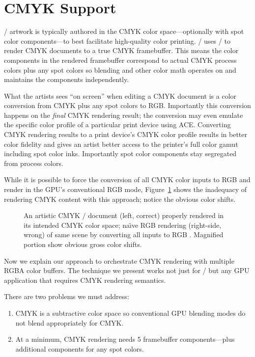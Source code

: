 
\section{CMYK Support}
\label{sec:cmyk}

\Illustrator/ artwork is typically authored in the CMYK color space---optionally with spot color components---to
best facilitate high-quality color printing.
\Illustrator/ uses \AGM/ to render CMYK documents to a true CMYK framebuffer.
This means the color components in the rendered framebuffer
correspond to actual CMYK process colors plus any spot colors so blending and other color math
operates on and maintains the components independently.

What the artists sees ``on screen'' when editing a CMYK document is a color conversion from CMYK plus any spot colors
to RGB.  Importantly this conversion happens on the {\em final} CMYK rendering result; the conversion may even emulate the
specific color profile of a particular print device using ACE.
Converting CMYK rendering results to a print device's CMYK
color profile results in better color fidelity and gives an artist better access to the printer's full color gamut
including spot color inks.  Importantly spot color components stay segregated from process colors.

While it is possible to force the conversion of all CMYK color inputs to RGB and render in the GPU's conventional
RGB mode, Figure~\ref{fig:cmyk-vs-rgb-emulation} shows
the inadequacy of rendering CMYK content with this approach; notice the obvious color shifts.

\begin{figure}[tb]
  \caption{\label{fig:cmyk-vs-rgb-emulation} An artistic CMYK \Illustrator/ document (left, correct) properly rendered
in its intended CMYK color space; na\"{\i}ve RGB rendering (right-side, wrong) of same scene by converting all inputs to RGB .  Magnified portion show obvious gross color shifts.}
\end{figure}

Now we explain our approach to orchestrate CMYK rendering with multiple RGBA color buffers.
The technique we present works not just for \Illustrator/ but any GPU application that requires
CMYK rendering semantics.

There are two problems we must address:
\begin{enumerate}
\item CMYK is a subtractive color space so conventional GPU blending modes do not blend appropriately for CMYK.
\item At a minimum, CMYK rendering needs 5 framebuffer components---plus additional components for any spot colors.
\end{enumerate}

